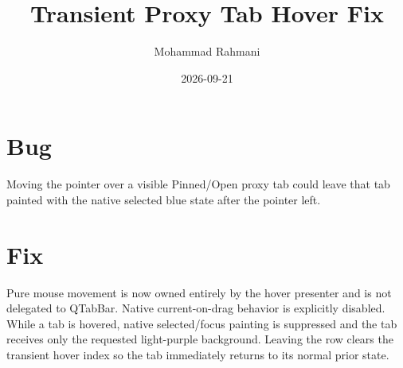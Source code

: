 \documentclass[a4paper]{article}
\title{Transient Proxy Tab Hover Fix}
\date{2026-09-21}
\author{Mohammad Rahmani}
\begin{document}
   \maketitle

   \begin{preview}
      \section{Bug}
      Moving the pointer over a visible Pinned/Open proxy tab could leave that
      tab painted with the native selected blue state after the pointer left.

      \section{Fix}
      Pure mouse movement is now owned entirely by the hover presenter and is
      not delegated to QTabBar. Native current-on-drag behavior is explicitly
      disabled. While a tab is hovered, native selected/focus painting is
      suppressed and the tab receives only the requested light-purple
      background. Leaving the row clears the transient hover index so the tab
      immediately returns to its normal prior state.
   \end{preview}

   
   
\end{document}

